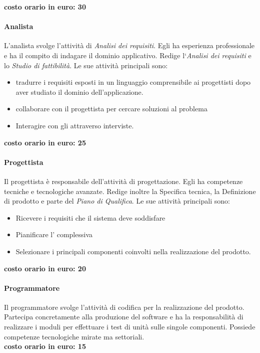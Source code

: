 \documentclass[../norme-di-progetto.tex]{subfiles}
\begin{document}
\textbf{costo orario in euro: 30}

\paragraph{Analista}%
\label{par:analista}
L'analista svolge l'attività di \textit{Analisi dei requisiti}.
Egli ha esperienza professionale e ha il compito di indagare il dominio applicativo.
Redige l`\textit{Analisi dei requisiti} e lo \textit{Studio di fattibilità}. Le sue attività principali sono:

\begin{itemize}
  \item tradurre i requisiti esposti in un linguaggio comprensibile ai progettisti dopo aver studiato il dominio dell'applicazione.
  \item collaborare con il progettista per cercare soluzioni al problema
  \item Interagire con gli  attraverso interviste.
\end{itemize}

\textbf{costo orario in euro: 25}

\paragraph{Progettista}%
\label{par:progettista}
Il progettista è responsabile dell'attività di progettazione.
Egli ha competenze tecniche e tecnologiche avanzate.
Redige inoltre la Specifica tecnica, la Definizione di prodotto e parte del \textit{Piano di Qualifica}.
Le sue attività principali sono:

\begin{itemize}
  \item Ricevere i requisiti che il sistema deve soddisfare
  \item Pianificare l' complessiva
  \item Selezionare i principali componenti coinvolti nella realizzazione del prodotto.
\end{itemize}

\textbf{costo orario in euro: 20}

\paragraph{Programmatore}%
\label{par:programmatore}
Il programmatore svolge l'attività di codifica per la realizzazione del prodotto.
Partecipa concretamente alla produzione del software e ha la responsabilità di realizzare i moduli per effettuare i test di unità sulle singole componenti.
Possiede competenze tecnologiche mirate ma settoriali.
\\\newline\textbf{costo orario in euro: 15}
\end{document}
